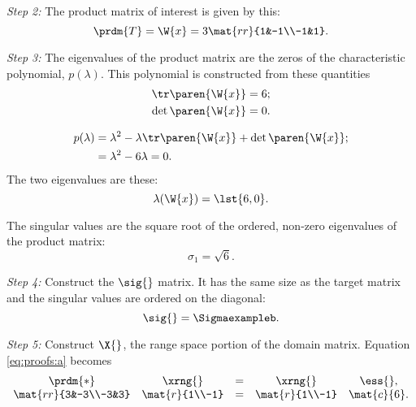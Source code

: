 \textit{Step 2:} The product matrix of interest is given by this:
\begin{equation}
  \prdm{T} = \W{x} = 3 \mat{rr}{1&-1\\-1&1}.
\end{equation}

\textit{Step 3:} The eigenvalues of the product matrix are the zeros of the characteristic polynomial, $p(\lambda)$. This polynomial is constructed from these quantities
\begin{equation}
  \begin{split}
    \tr \paren{\W{x}} & = 6;\\
    \det \paren{\W{x}}& = 0.
  \end{split}
\end{equation}

\begin{equation}
  \begin{split}
    p(\lambda) & = \lambda^{2} - \lambda \tr \paren{\W{x}} +\det \paren{\W{x}};\\
    &= \lambda^{2} - 6 \lambda = 0.
  \end{split}
\end{equation}
The two eigenvalues are these:
\begin{equation}
  \lambda(\W{x}) = \lst{6,0}.
\end{equation}

The singular values are the square root of the ordered, non-zero eigenvalues of the product matrix:
\begin{equation}
  \sigma_{1} = \sqrt{6}.
\end{equation}

\textit{Step 4:} Construct the $\sig{}$ matrix. It has the same size as the target matrix and the singular values are ordered on the diagonal:
\begin{equation}
  \sig{} = \Sigmaexampleb.
\end{equation}

\textit{Step 5:} Construct $\X{}_{}$, the range space portion of the domain matrix. Equation \eqref{eq:proofs:a} becomes
\begin{equation}
\begin{array}{ccccc}
  \prdm{*}&\xrng{} &=& \xrng{}&\ess{},\\
  \mat{rr}{3&-3\\-3&3}&\mat{r}{1\\-1} &=& \mat{r}{1\\-1} & \mat{c}{6}.
\end{array}
\end{equation}

